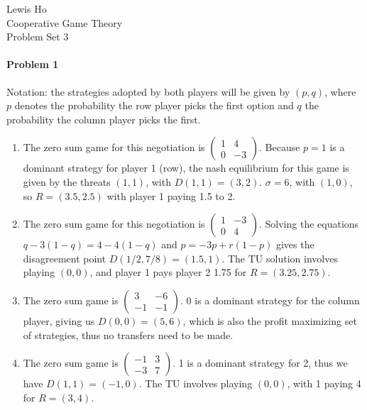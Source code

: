 \documentclass[12pt]{article}
\begin{document}
\begin{center}
  Lewis Ho\\
  Cooperative Game Theory\\
  Problem Set 3
\end{center}

\paragraph{Problem 1}
Notation: the strategies adopted by both players will be given by $(p,q)$,
where $p$ denotes the probability the row player picks the first option and
$q$ the probability the column player picks the first.
\begin{enumerate}[label=(\alph*)]
\item The zero sum game for this negotiation is $
  \begin{pmatrix}
    1 & 4\\
    0 & -3
  \end{pmatrix}.
  $
  Because $p = 1$ is a dominant strategy for player 1 (row), the nash equilibrium
  for this game is given by the threats $(1,1)$, with $D(1,1) = (3,2)$. $\sigma =
  6$, with $(1,0)$, so $R = (3.5, 2.5)$ with player 1 paying 1.5 to 2.
\item The zero sum game for this negotiation is $
  \begin{pmatrix}
    1 & -3\\
    0 & 4
  \end{pmatrix}
  $. Solving the equations $q - 3(1-q) = 4-4(1-q)$ and $p = -3p+r(1-p)$ gives
  the disagreement point $D(1/2,7/8) = (1.5,1)$. The TU solution involves
  playing $(0,0)$, and player 1 pays player 2 1.75 for $R = (3.25, 2.75)$.
\item The zero sum game is $
  \begin{pmatrix}
    3 & -6\\
    -1 & -1
  \end{pmatrix}
  $. 0 is a dominant strategy for the column player, giving us $D(0,0) = (5,6)$,
  which is also the profit maximizing set of strategies, thus no transfers need
  to be made.
\item The zero sum game is $
  \begin{pmatrix}
    -1 & 3\\
    -3 & 7
  \end{pmatrix}
  $. 1 is a dominant strategy for 2, thus we have $D(1,1) = (-1,0)$. The TU
  involves playing $(0,0)$, with 1 paying 4 for $R = (3,4)$.

\end{enumerate}
\end{document}
